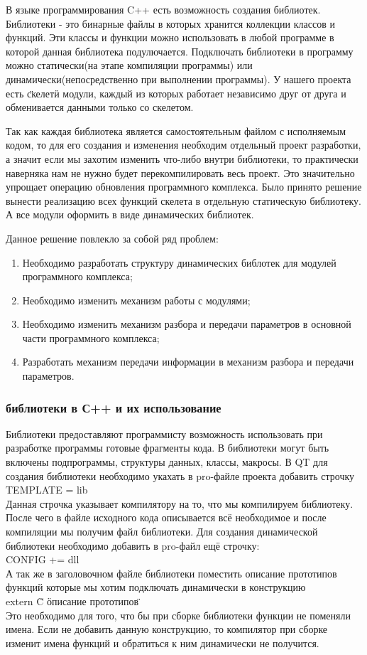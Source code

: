 В языке программирования C++ есть возможность создания библиотек. Библиотеки - это бинарные файлы в которых хранится коллекции классов и функций. Эти классы и функции можно использовать в любой программе в которой данная библиотека подулючается. Подключать библиотеки в программу можно статически(на этапе компиляции программы) или динамически(непосредственно при выполнении программы). У нашего проекта есть \"скелет\" и модули, каждый из которых работает независимо друг от друга и обменивается данными только со скелетом. 

Так как каждая библиотека является самостоятельным файлом с исполняемым кодом, то для его создания и изменения необходим отдельный проект разработки, а значит если мы захотим изменить что-либо внутри библиотеки, то практически наверняка нам не нужно будет перекомпилировать весь проект. Это значительно упрощает операцию обновления программного комплекса. Было принято решение вынести реализацию всех функций скелета в отдельную статическую библиотеку. А все модули оформить в виде динамических библиотек. 

Данное решение повлекло за собой ряд проблем:
\begin{enumerate}
\item Необходимо разработать структуру динамических библотек для модулей программного комплекса;
\item Необходимо изменить механизм работы с модулями;
\item Необходимо изменить механизм разбора и передачи параметров в основной части программного комплекса;
\item Разработать механизм передачи информации в механизм разбора и передачи параметров.
\end{enumerate}

\subsubsection{библиотеки в С++ и их использование}

Библиотеки предоставляют программисту возможность использовать при разработке программы готовые фрагменты кода. В библиотеки могут быть включены подпрограммы, структуры данных, классы, макросы. В QT для создания библиотеки необходимо укахать в pro-файле проекта добавить строчку \\
TEMPLATE = lib\\
Данная строчка указывает компилятору на то, что мы компилируем библиотеку. После чего в файле исходного кода описывается всё необходимое и после компиляции мы получим файл библиотеки. Для создания динамической библиотеки необходимо добавить в pro-файл ещё строчку: \\
CONFIG += dll\\
А так же в заголовочном файле библиотеки поместить описание прототипов функций которые мы хотим подключать динамически в конструкцию\\
extern \"C\"{ \"описание прототипов\" }\\
Это необходимо для того, что бы при сборке библиотеки функции не поменяли имена. Если не добавить данную конструкцию, то компилятор при сборке изменит имена функций и обратиться к ним динамически не получится.


